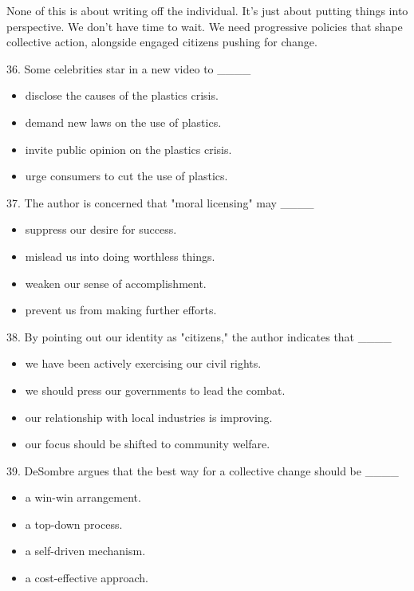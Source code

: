 \documentclass[UTF8,11pt]{ctexart}
\begin{document}
None of this is about writing off the individual. It's just about putting things into perspective. We don't have time to wait. We need progressive policies that shape collective action, alongside engaged citizens pushing for change.


36. Some celebrities star in a new video to \_\_\_\_


\begin{itemize}[leftmargin=2em,itemsep=.2em,topsep=.4em]\item[A.] disclose the causes of the plastics crisis.
\item[B.] demand new laws on the use of plastics.
\item[C.] invite public opinion on the plastics crisis.
\item[D.] urge consumers to cut the use of plastics.
\end{itemize}

37. The author is concerned that "moral licensing" may \_\_\_\_


\begin{itemize}[leftmargin=2em,itemsep=.2em,topsep=.4em]\item[A.] suppress our desire for success.
\item[B.] mislead us into doing worthless things.
\item[C.] weaken our sense of accomplishment.
\item[D.] prevent us from making further efforts.
\end{itemize}

38. By pointing out our identity as "citizens," the author indicates that \_\_\_\_


\begin{itemize}[leftmargin=2em,itemsep=.2em,topsep=.4em]\item[A.] we have been actively exercising our civil rights.
\item[B.] we should press our governments to lead the combat.
\item[C.] our relationship with local industries is improving.
\item[D.] our focus should be shifted to community welfare.
\end{itemize}

39. DeSombre argues that the best way for a collective change should be \_\_\_\_


\begin{itemize}[leftmargin=2em,itemsep=.2em,topsep=.4em]\item[A.] a win-win arrangement.
\item[B.] a top-down process.
\item[C.] a self-driven mechanism.
\item[D.] a cost-effective approach.
\end{itemize}
\end{document}
